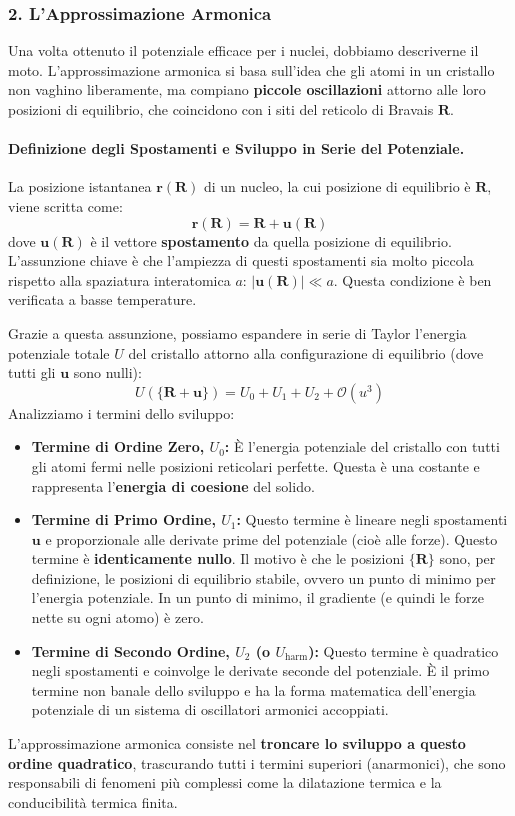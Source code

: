 \subsubsection{2. L'Approssimazione Armonica}
Una volta ottenuto il potenziale efficace per i nuclei, dobbiamo descriverne il moto. L'approssimazione armonica si basa sull'idea che gli atomi in un cristallo non vaghino liberamente, ma compiano \textbf{piccole oscillazioni} attorno alle loro posizioni di equilibrio, che coincidono con i siti del reticolo di Bravais \(\mathbf{R}\).

\paragraph{Definizione degli Spostamenti e Sviluppo in Serie del Potenziale.}
La posizione istantanea \(\mathbf{r}(\mathbf{R})\) di un nucleo, la cui posizione di equilibrio è \(\mathbf{R}\), viene scritta come:
\[ \mathbf{r}(\mathbf{R}) = \mathbf{R} + \mathbf{u}(\mathbf{R}) \]
dove \(\mathbf{u}(\mathbf{R})\) è il vettore \textbf{spostamento} da quella posizione di equilibrio. L'assunzione chiave è che l'ampiezza di questi spostamenti sia molto piccola rispetto alla spaziatura interatomica \(a\): \(|\mathbf{u}(\mathbf{R})| \ll a\). Questa condizione è ben verificata a basse temperature.

Grazie a questa assunzione, possiamo espandere in serie di Taylor l'energia potenziale totale \(U\) del cristallo attorno alla configurazione di equilibrio (dove tutti gli \(\mathbf{u}\) sono nulli):
\[ U(\lbrace \mathbf{R}+\mathbf{u} \rbrace) = U_0 + U_1 + U_2 + \mathcal{O}(u^3) \]
Analizziamo i termini dello sviluppo:
\begin{itemize}
    \item \textbf{Termine di Ordine Zero, \(U_0\):} È l'energia potenziale del cristallo con tutti gli atomi fermi nelle posizioni reticolari perfette. Questa è una costante e rappresenta l'\textbf{energia di coesione} del solido.
    \item \textbf{Termine di Primo Ordine, \(U_1\):} Questo termine è lineare negli spostamenti \(\mathbf{u}\) e proporzionale alle derivate prime del potenziale (cioè alle forze). Questo termine è \textbf{identicamente nullo}. Il motivo è che le posizioni \(\lbrace \mathbf{R} \rbrace\) sono, per definizione, le posizioni di equilibrio stabile, ovvero un punto di minimo per l'energia potenziale. In un punto di minimo, il gradiente (e quindi le forze nette su ogni atomo) è zero.
    \item \textbf{Termine di Secondo Ordine, \(U_2\) (o \(U_{\text{harm}}\)):} Questo termine è quadratico negli spostamenti e coinvolge le derivate seconde del potenziale. È il primo termine non banale dello sviluppo e ha la forma matematica dell'energia potenziale di un sistema di oscillatori armonici accoppiati.
\end{itemize}
L'approssimazione armonica consiste nel \textbf{troncare lo sviluppo a questo ordine quadratico}, trascurando tutti i termini superiori (anarmonici), che sono responsabili di fenomeni più complessi come la dilatazione termica e la conducibilità termica finita.

